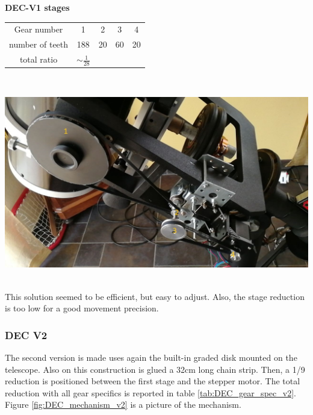 \documentclass{article}
\begin{document}
\begin{multicols}{2}
        \begin{minipage}
            {0.5\textwidth}
            \centering
            \textbf{DEC-V1 stages}\\
            \begin{tabular}{ccccc}
                \hline
                Gear number & 1 & 2 & 3 & 4 \\
                number of teeth & 188 & 20 & 60 & 20 \\
                \hline
                total ratio & \(\sim \frac{1}{28}\) &&&
            \end{tabular}
            \label{tab:DEC_gear_spec}
        \end{minipage}
        \\
        \begin{minipage}
            {0.5\textwidth}
            \centering
            \includegraphics[scale=.28]{DEC_motorization.jpg}
            \label{fig:DEC_mechanism}
        \end{minipage}
        \\
        This solution seemed to be efficient, but easy to adjust.
        Also, the stage reduction is too low for a good movement precision.

        \subsubsection{DEC V2}
        The second version is made uses again the built-in graded disk mounted on the telescope.
        Also on this construction is glued a 32cm long chain strip.
        Then, a 1/9 reduction is positioned between the first stage and the stepper motor.
        The total reduction with all gear specifics is reported in table \ref{tab:DEC_gear_spec_v2}.
        Figure \ref{fig:DEC_mechanism_v2} is a picture of the mechanism.


\end{multicols}
\end{document}
